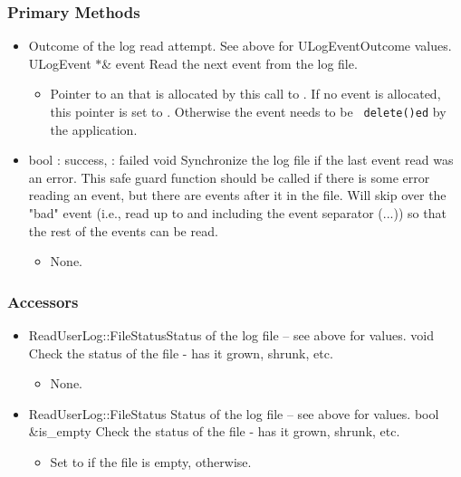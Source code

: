 \subsubsection{Primary Methods}
\begin{itemize}

\item {}
  {}
  {Outcome of the log read attempt. See above for ULogEventOutcome
  values.}
  {ULogEvent $*$\& event}
  {Read the next event from the log file.}
  \begin{itemize}
  \item {}
    Pointer to an  that is allocated by this call to
    .
    If no event is allocated, this pointer is
    set to .  Otherwise the event needs to be {\tt
    delete()ed} by the application.
  \end{itemize}

\item {}
  {bool} {: success, : failed}
  {void}
  {Synchronize the log file if the last event read was an error.  This
    safe guard function should be called if there is some error reading an
    event, but there are events after it in the file.  Will skip over the
    "bad" event (i.e., read up to and including the event separator (...))
    so that the rest of the events can be read.}
  \begin{itemize}\item None. \end{itemize}

\end{itemize}

\subsubsection{Accessors}
\begin{itemize}

\item {}
  {ReadUserLog::FileStatus}{Status of the log file -- see above for values.}
  {void}
  {Check the status of the file - has it grown, shrunk, etc.}
  \begin{itemize}\item None. \end{itemize}

\item {}
  {ReadUserLog::FileStatus} {Status of the log file -- see above for values.}
  {bool \&is\_empty}
  {Check the status of the file - has it grown, shrunk, etc.}
  \begin{itemize}
  \item {}
    Set to  if the file is empty,  otherwise.
  \end{itemize}

\end{itemize}


